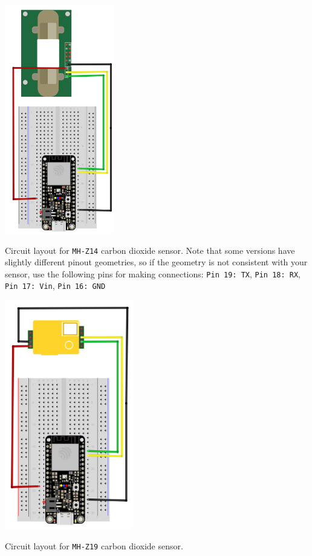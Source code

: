 \begin{marginfigure}
	\begin{center}
		\includegraphics[height=10cm]{Images/mh-z14.png}
		\caption[MHZ14]{Circuit layout for \texttt{MH-Z14} carbon dioxide sensor. Note that some versions have slightly different pinout geometries, so if the geometry is not consistent with your sensor, use the following pins for making connections:  \texttt{Pin 19: TX}, \texttt{Pin 18: RX}, \texttt{Pin 17: Vin}, \texttt{Pin 16: GND}}
	\end{center}
\end{marginfigure}

\begin{marginfigure}
	\begin{center}
		\includegraphics[height=10cm]{Images/mh-z19.png}
		\caption[MHZ19]{Circuit layout for \texttt{MH-Z19} carbon dioxide sensor.}
	\end{center}
\end{marginfigure}

